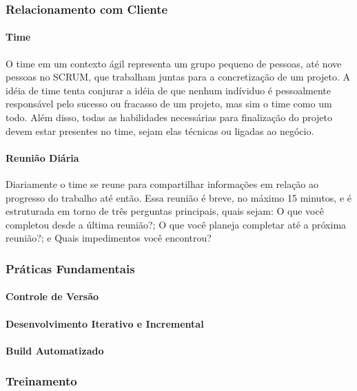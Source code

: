 \documentclass[
	article,			%
	11pt,				%
	oneside,			%
	a4paper,			%
	english,			%
	brazil,				%
	sumario=tradicional
	]{abntex2}
\begin{document}
\subsubsection*{Relacionamento com Cliente}

\paragraph*{Time}
O time em um contexto ágil representa um grupo pequeno de pessoas, até nove pessoas no SCRUM, que trabalham juntas para a concretização de um projeto. A idéia de time tenta conjurar a idéia de que nenhum indíviduo é pessoalmente responsável pelo sucesso ou fracasso de um projeto, mas sim o time como um todo. Além disso, todas as habilidades necessárias para finalização do projeto devem estar presentes no time, sejam elas técnicas ou ligadas ao negócio.

\paragraph*{Reunião Diária}
Diariamente o time se reune para compartilhar informações em relação ao progresso do trabalho até então. Essa reunião é breve, no máximo 15 minutos, e é estruturada em torno de três perguntas principais, quais sejam: O que você completou desde a última reunião?; O que você planeja completar até a próxima reunião?; e Quais impedimentos você encontrou?

\subsubsection*{Práticas Fundamentais}

\paragraph*{Controle de Versão}

\paragraph*{Desenvolvimento Iterativo e Incremental}

\paragraph*{Build Automatizado}


\subsubsection*{Treinamento}
\end{document}
